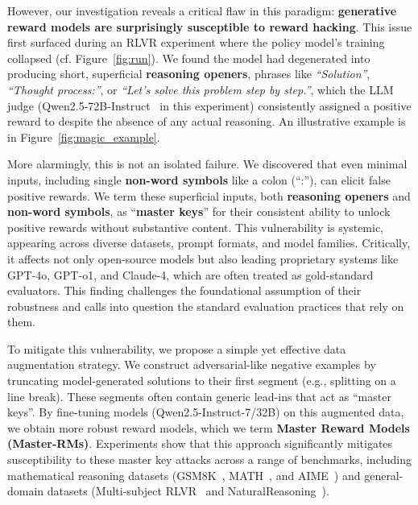 However, our investigation reveals a critical flaw in this paradigm: \textbf{generative reward models are surprisingly susceptible to reward hacking}. This issue first surfaced during an RLVR experiment where the policy model's training collapsed (cf. Figure~\ref{fig:run}). We found the model had degenerated into producing short, superficial \textbf{reasoning openers}, phrases like \emph{``Solution''}, \emph{``Thought process:''}, or \emph{``Let’s solve this problem step by step.''}, which the LLM judge (Qwen2.5-72B-Instruct~\citep{qwen2.5} in this experiment) consistently assigned a positive reward to despite the absence of any actual reasoning. An illustrative example is in Figure~\ref{fig:magic_example}.



More alarmingly, this is not an isolated failure. We discovered that even minimal inputs, including single \textbf{non-word symbols} like a colon (``:''), can elicit false positive rewards. We term these superficial inputs, both \textbf{reasoning openers} and \textbf{non-word symbols}, as ``\textbf{master keys}'' for their consistent ability to unlock positive rewards without substantive content. This vulnerability is systemic, appearing across diverse datasets, prompt formats, and model families. Critically, it affects not only open-source models but also leading proprietary systems like GPT-4o, GPT-o1, and Claude-4, which are often treated as gold-standard evaluators. This finding challenges the foundational assumption of their robustness and calls into question the standard evaluation practices that rely on them.

 


To mitigate this vulnerability, we propose a simple yet effective data augmentation strategy.  We construct adversarial-like negative examples by truncating model-generated solutions to their first segment (e.g., splitting on a line break). These segments often contain generic lead-ins that act as ``master keys''. By fine-tuning models (Qwen2.5-Instruct-7/32B) on this augmented data, we obtain more robust reward models, which we term \textbf{Master Reward Models (Master-RMs)}. Experiments show that this approach significantly mitigates susceptibility to these master key attacks across a range of benchmarks, including mathematical reasoning datasets (GSM8K~\citep{cobbe2021gsm8k}, MATH~\citep{math}, and AIME~\citep{aime_1983_2024}) and general-domain datasets (Multi-subject RLVR~\citep{yu-2021-self-teaching,su2025crossing} and NaturalReasoning~\citep{yuan2025naturalreasoning}). 



